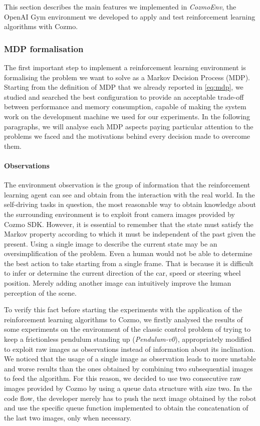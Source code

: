 This section describes the main features we implemented in \textit{CozmoEnv}, the OpenAI Gym environment we developed to apply and test reinforcement learning algorithms with Cozmo. 

\subsubsection{MDP formalisation}

The first important step to implement a reinforcement learning environment is formalising the problem we want to solve as a Markov Decision Process (MDP). Starting from the definition of MDP that we already reported in \vref{eq:mdp}, we studied and searched the best configuration to provide an acceptable trade-off between performance and memory consumption, capable of making the system work on the development machine we used for our experiments. In the following paragraphs, we will analyse each MDP aspects paying particular attention to the problems we faced and the motivations behind every decision made to overcome them.

\paragraph{Observations} The environment observation is the group of information that the reinforcement learning agent can see and obtain from the interaction with the real world. In the self-driving tasks in question, the most reasonable way to obtain knowledge about the surrounding environment is to exploit front camera images provided by Cozmo SDK. However, it is essential to remember that the state must satisfy the Markov property according to which it must be independent of the past given the present. Using a single image to describe the current state may be an oversimplification of the problem. Even a human would not be able to determine the best action to take starting from a single frame. That is because it is difficult to infer or determine the current direction of the car, speed or steering wheel position. Merely adding another image can intuitively improve the human perception of the scene.

To verify this fact before starting the experiments with the application of the reinforcement learning algorithms to Cozmo, we firstly analysed the results of some experiments on the environment of the classic control problem of trying to keep a frictionless pendulum standing up (\textit{Pendulum-v0}), appropriately modified to exploit raw images as observations instead of information about its inclination. We noticed that the usage of a single image as observation leads to more unstable and worse results than the ones obtained by combining two subsequential images to feed the algorithm. For this reason, we decided to use two consecutive raw images provided by Cozmo by using a queue data structure with size two. In the code flow, the developer merely has to push the next image obtained by the robot and use the specific queue function implemented to obtain the concatenation of the last two images, only when necessary.

